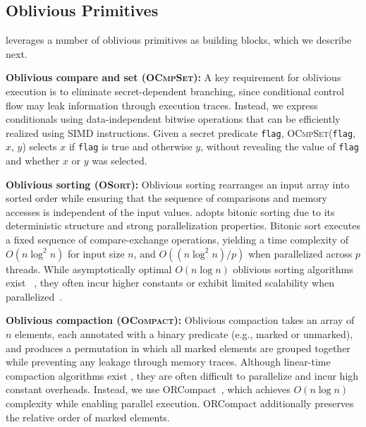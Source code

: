 \subsection{Oblivious Primitives}
\label{sub:obl-primitives}

\system leverages a number of oblivious primitives as building blocks, which we describe next.

\noindent\textbf{Oblivious compare and set (\textsc{OCmpSet}):}  
A key requirement for oblivious execution is to eliminate secret-dependent branching,
since conditional control flow may leak information through execution traces.  
Instead, we express conditionals using data-independent bitwise operations that can be
efficiently realized using SIMD instructions.  
Given a secret predicate \texttt{flag}, \textsc{OCmpSet}(\texttt{flag}, $x$, $y$) selects $x$ if \texttt{flag}
is true and otherwise $y$, without revealing the value of \texttt{flag} and whether $x$ or $y$ was selected.

\noindent\textbf{Oblivious sorting (\textsc{OSort}):}  
Oblivious sorting rearranges an input array into sorted order while ensuring that the
sequence of comparisons and memory accesses is independent of the input values.
\system adopts bitonic sorting \cite{batcher1968sorting} due to its deterministic structure and 
strong parallelization properties. Bitonic sort executes a fixed sequence of compare-exchange
operations, yielding a time complexity of $O(n \log^2 n)$ for input size $n$, and
$O((n \log^2 n)/p)$ when parallelized across $p$ threads.  
While asymptotically optimal $O(n \log n)$ oblivious sorting algorithms exist ~\cite{ajtai1983sorting, 
goodrich2014zigzag, gu2025flexway}, they often incur higher constants or exhibit limited scalability when
parallelized~\cite{ngai2024distributed}.  

\noindent\textbf{Oblivious compaction (\textsc{OCompact}):}  
Oblivious compaction takes an array of $n$ elements, each annotated with a binary
predicate (e.g., marked or unmarked), and produces a permutation in which all marked
elements are grouped together while preventing any leakage through memory traces.  
Although linear-time compaction algorithms exist \cite{dittmer2020oblivious,goodrich2011oblivious},
they are often difficult to parallelize and incur high constant overheads. Instead, we use 
ORCompact~\cite{sasy2022fast}, which achieves $O(n \log n)$ complexity while enabling parallel execution.  
ORCompact additionally preserves the relative order of marked elements.

